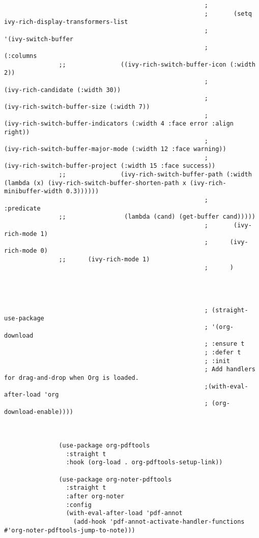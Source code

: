 \documentclass[11pt]{article}
\begin{document}
\begin{verbatim}
                                                       ;
                                                       ;       (setq ivy-rich-display-transformers-list
                                                       ;             '(ivy-switch-buffer
                                                       ;               (:columns
               ;;               ((ivy-rich-switch-buffer-icon (:width 2))
                                                       ;                (ivy-rich-candidate (:width 30))
                                                       ;                (ivy-rich-switch-buffer-size (:width 7))
                                                       ;               (ivy-rich-switch-buffer-indicators (:width 4 :face error :align right))
                                                       ;                (ivy-rich-switch-buffer-major-mode (:width 12 :face warning))
                                                       ;                (ivy-rich-switch-buffer-project (:width 15 :face success))
               ;;               (ivy-rich-switch-buffer-path (:width (lambda (x) (ivy-rich-switch-buffer-shorten-path x (ivy-rich-minibuffer-width 0.3))))))
                                                       ;                :predicate
               ;;                (lambda (cand) (get-buffer cand)))))
                                                       ;       (ivy-rich-mode 1)
                                                       ;      (ivy-rich-mode 0)
               ;;      (ivy-rich-mode 1)
                                                       ;      )




                                                       ; (straight-use-package 
                                                       ; '(org-download
                                                       ; :ensure t
                                                       ; :defer t
                                                       ; :init
                                                       ; Add handlers for drag-and-drop when Org is loaded.
                                                       ;(with-eval-after-load 'org
                                                       ; (org-download-enable))))



               (use-package org-pdftools
                 :straight t
                 :hook (org-load . org-pdftools-setup-link))

               (use-package org-noter-pdftools
                 :straight t
                 :after org-noter
                 :config
                 (with-eval-after-load 'pdf-annot
                   (add-hook 'pdf-annot-activate-handler-functions #'org-noter-pdftools-jump-to-note)))


\end{verbatim}
\end{document}
